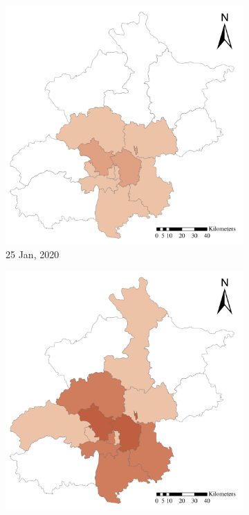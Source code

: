 \documentclass[ijgi,submit,moreauthors,pdftex]{Definitions/mdpi}
\begin{document}
\begin{figure}[ht]
    \centering
    \begin{subfigure}{.23\textwidth}
        \includegraphics[width=\textwidth]{Figures/ConfirmedDistrictD2020_01_25-eps-converted-to.pdf}
        \caption{25 Jan, 2020}
    \end{subfigure}
    \begin{subfigure}{.23\textwidth}
        \includegraphics[width=\textwidth]{Figures/ConfirmedDistrictD2020_01_30-eps-converted-to.pdf}

\end{subfigure}
\end{figure}
\end{document}
